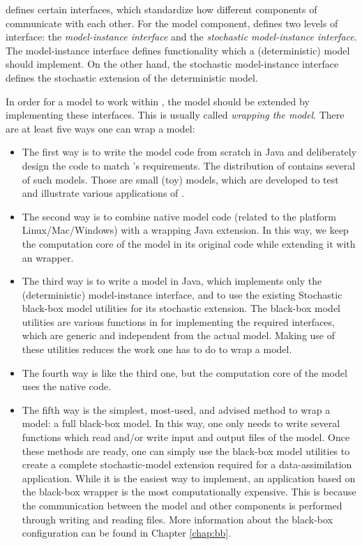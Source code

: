 \oda defines certain interfaces, which standardize how different components of \oda communicate with each other. For the model component, \oda defines two levels of interface: the \emph{model-instance interface} and the \emph{stochastic model-instance interface}. The model-instance interface defines functionality which a (deterministic) model should implement. On the other hand, the stochastic model-instance interface defines the stochastic extension of the deterministic model.

In order for a model to work within \oda, the model should be extended by implementing these interfaces. This is usually called \emph{wrapping the model}. There are at least five ways one can wrap a model:
\begin{itemize}
\item The first way is to write the model code from scratch in Java and deliberately design the code to match \oda's requirements. The distribution of \oda contains several of such models. Those are small (toy) models, which are developed to test and illustrate various applications of \oda. 
\item The second way is to combine native model code (related to the platform Linux/Mac/Win\-dows) with a wrapping Java extension. In this way, we keep the computation core of the model in its original code while extending it with an \oda wrapper. 
\item The third way is to write a model in Java, which implements only the (deterministic) model-instance interface, and to use the existing Stochastic black-box model utilities for its stochastic extension. The black-box model utilities are various functions in \oda for implementing the required interfaces, which are generic and independent from the actual model. Making use of these utilities reduces the work one has to do to wrap a model. 
\item The fourth way is like the third one, but the computation core of the model uses the native code. 
\item The fifth way is the simplest, most-used, and advised method to wrap a model: a full black-box model. In this way, one only needs to write several functions which read and/or write input and output files of the model. Once these methods are ready, one can simply use the black-box model utilities to create a complete stochastic-model extension required for a data-assimilation application. While it is the easiest way to implement, an application based on the black-box wrapper is the most computationally expensive. This is because the communication between the model and other \oda components is performed through writing and reading files. More information about the black-box configuration can be found in Chapter \ref{chap:bb}.
\end{itemize}

